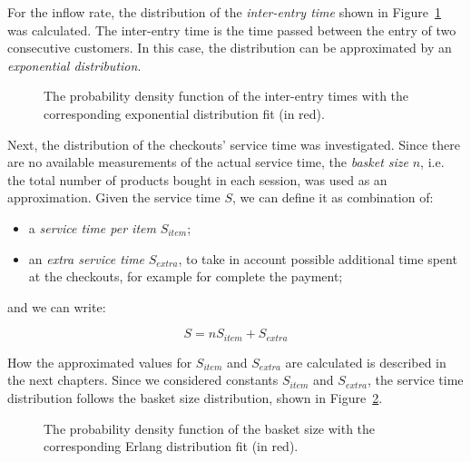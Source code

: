 For the inflow rate, the distribution of the \emph{inter-entry time} shown in Figure~\ref{fig:inter_entry_time_distribution} was calculated. The inter-entry time is the time passed between the entry of two consecutive customers. In this case, the distribution can be approximated by an \emph{exponential distribution}.

\begin{figure}
  \begin{center}
  \end{center}
  \caption{The probability density function of the inter-entry times with the corresponding exponential distribution fit (in red).}
  \label{fig:inter_entry_time_distribution}
\end{figure}

Next, the distribution of the checkouts’ service time was investigated. Since there are no available measurements of the actual service time, the \emph{basket size} \( n \), i.e. the total number of products bought in each session, was used as an approximation. Given the service time \( S \), we can define it as combination of:
\begin{itemize}
  \item a \emph{service time per item} \( S_{item} \);
  \item an \emph{extra service time} \( S_{extra} \), to take in account possible additional time spent at the checkouts, for example for complete the payment;
\end{itemize}
and we can write:

\begin{equation}
  S = n S_{item} + S_{extra}
  \label{eq:service_time}
\end{equation}

How the approximated values for \( S_{item} \) and \( S_{extra} \) are calculated is described in the next chapters. Since we considered constants \( S_{item} \) and \( S_{extra} \), the service time distribution follows the basket size distribution, shown in Figure~\ref{fig:basket_size_distribution}.

\begin{figure}
  \begin{center}
  \end{center}
  \caption{The probability density function of the basket size with the corresponding Erlang distribution fit (in red).}
  \label{fig:basket_size_distribution}
\end{figure}

